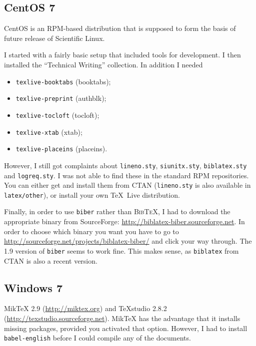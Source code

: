 \documentclass[UKenglish]{latex/atlasdoc}
\newcommand{\BibTeX}{\textsc{Bib\TeX}}
\newcommand{\File}[1]{\texttt{#1}\xspace}
\newcommand{\Package}[1]{\texttt{#1}\xspace}
\begin{document}
\subsection{CentOS 7} 

CentOS is an RPM-based distribution that is supposed to form the basis of future
release of Scientific Linux.

I started with a fairly basic setup that included tools for development.
I then installed the \enquote{Technical Writing} collection.
In addition I needed 
\begin{itemize}\setlength{\parskip}{0pt}\setlength{\itemsep}{0pt}
\item \Package{texlive-booktabs} (booktabs);
\item \Package{texlive-preprint} (authblk);
\item \Package{texlive-tocloft} (tocloft);
\item \Package{texlive-xtab} (xtab);
\item \Package{texlive-placeins} (placeins).
\end{itemize}
However, I still got complaints about \File{lineno.sty}, \File{siunitx.sty},
\File{biblatex.sty} and \File{logreq.sty}.
I was not able to find these in the standard RPM repositories.
You can either get and install them from CTAN (\File{lineno.sty} is also available in \File{latex/other}),
or install your own \TeX\ Live distribution.

Finally, in order to use \Package{biber} rather than \BibTeX,
I had to download the appropriate binary from SourceForge:
\url{http://biblatex-biber.sourceforge.net}.
In order to choose which binary you want you have to go to
\url{http://sourceforge.net/projects/biblatex-biber/} and click your way through.
The 1.9 version of \Package{biber} seems to work fine.
This makes sense, as \Package{biblatex} from CTAN is also a recent version.


\subsection{Windows 7}

MikTeX 2.9 (\url{http://miktex.org}) and TeXstudio 2.8.2 (\url{http://texstudio.sourceforge.net}).
MikTeX has the advantage that it installs missing packages, provided you activated that option.
However, I had to install \Package{babel-english} before I could compile any of the documents.
\end{document}
